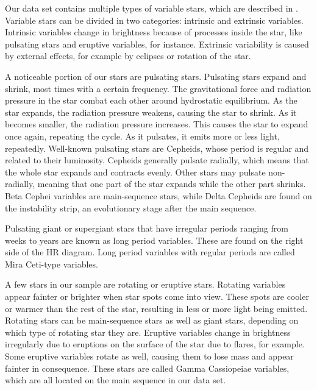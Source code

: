 \documentclass[onecolumn]{aa} %
\begin{document}
  

  Our data set contains multiple types of variable stars, which are described in \cite{Samus_2004}.
  Variable stars can be divided in two categories: intrinsic and extrinsic variables.
  Intrinsic variables change in brightness because of processes inside the star, like pulsating stars and eruptive variables, for instance.
  Extrinsic variability is caused by external effects, for example by eclipses or rotation of the star.

  A noticeable portion of our stars are pulsating stars.
  Pulsating stars expand and shrink, most times with a certain frequency. The gravitational force and radiation pressure in the star combat each other around hydrostatic equilibrium. As the star expands, the radiation pressure weakens, causing the star to shrink. As it becomes smaller, the radiation pressure increases. This causes the star to expand once again, repeating the cycle. As it pulsates, it emits more or less light, repeatedly.
Well-known pulsating stars are Cepheids, whose period is regular and related to their luminosity. Cepheids generally pulsate radially, which means that the whole star expands and contracts evenly. Other stars may pulsate non-radially, meaning that one part of the star expands while the other part shrinks. Beta Cephei variables are main-sequence stars, while Delta Cepheids are found on the instability strip, an evolutionary stage after the main sequence.

Pulsating giant or supergiant stars that have irregular periods ranging from weeks to years are known as long period variables. These are found on the right side of the HR diagram. Long period variables with regular periods are called Mira Ceti-type variables. 

A few stars in our sample are rotating or eruptive stars. Rotating variables appear fainter or brighter when star spots come into view. These spots are cooler or warmer than the rest of the star, resulting in less or more light being emitted. Rotating stars can be main-sequence stars as well as giant stars, depending on which type of rotating star they are. Eruptive variables change in brightness irregularly due to eruptions on the surface of the star due to flares, for example. Some eruptive variables rotate as well, causing them to lose mass and appear fainter in consequence. These stars are called Gamma Cassiopeiae variables, which are all located on the main sequence in our data set. 
\end{document}
